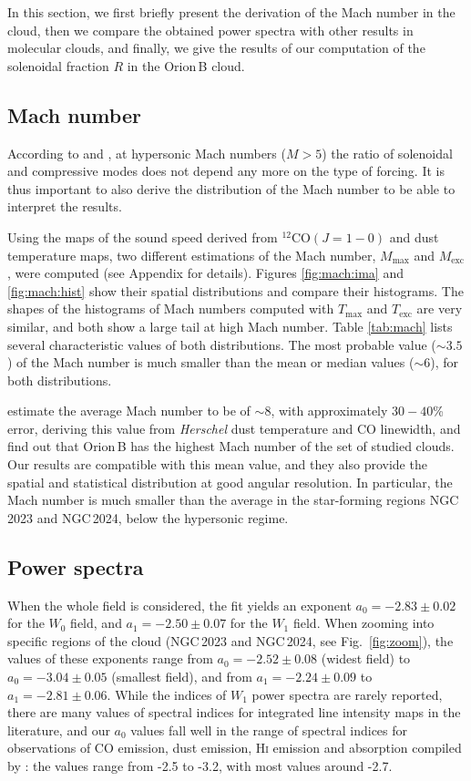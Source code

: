 \documentclass[structabstract]{aa}
\newcommand{\emm}[1]{\ensuremath{#1}}
\newcommand{\emr}[1]{\emm{\mathrm{#1}}}
\begin{document}
In this section, we first briefly present the derivation of the Mach number in the cloud, then we compare the obtained power spectra with other results in molecular clouds, and finally, we give the results of our computation of the solenoidal fraction $R$ in the Orion\,B cloud.

\subsection{Mach number}
\label{sec:mach}
According to \citet{brunt14} and \citet{federrath11}, at hypersonic Mach numbers ($M > 5$) the ratio of solenoidal and compressive modes does not depend any more on the type of forcing. It is thus important to also derive the distribution of the Mach number to be able to interpret the results.

Using the maps of the sound speed derived from $^{12}$CO$(J=1-0)$ and dust temperature maps, two different estimations of the Mach number, $M_\emr{max}$ and $M_\emr{exc}$, were computed (see Appendix for details). Figures \ref{fig:mach:ima} and \ref{fig:mach:hist} show their spatial distributions and compare their histograms. The shapes of the histograms of Mach numbers computed with $T_\emr{max}$ and $T_\emr{exc}$ are very similar, and both show a large tail at high Mach number. Table \ref{tab:mach} lists several characteristic values of both distributions. The most probable value ($\sim3.5$) of the Mach number is much smaller than the mean or median values ($\sim6$), for both distributions.

\citet{schneider13} estimate the average Mach number to be of $\sim 8$, with approximately $30 - 40$\% error, deriving this value from \emph{Herschel} dust temperature and CO linewidth, and find out that Orion\,B has the highest Mach number of the set of studied clouds. Our results are compatible with this mean value, and they also provide the spatial and statistical distribution at good angular resolution. In particular, the Mach number is much smaller than the average in the star-forming regions NGC\,2023 and NGC\,2024, below the hypersonic regime.

\subsection{Power spectra}

When the whole field is considered, the fit yields an exponent $a_0 = -2.83 \pm 0.02$ for the $W_0$ field, and $a_1 = -2.50 \pm 0.07$ for the $W_1$ field. When zooming into specific regions of the cloud (NGC\,2023 and NGC\,2024, see Fig.~\ref{fig:zoom}), the values of these exponents range from $a_0 = -2.52 \pm 0.08$ (widest field) to $a_0 = -3.04 \pm 0.05$ (smallest field), and from $a_1 = -2.24 \pm 0.09$ to $a_1 = -2.81 \pm 0.06$. While the indices of $W_1$ power spectra are rarely reported, there are many values of spectral indices for integrated line intensity maps in the literature, and our $a_0$ values fall well in the range of spectral indices for observations of CO emission, dust emission, \textsc{Hi} emission and absorption compiled by \citet{hennebelle12}: the values range from -2.5 to -3.2, with most values around -2.7.
\end{document}
